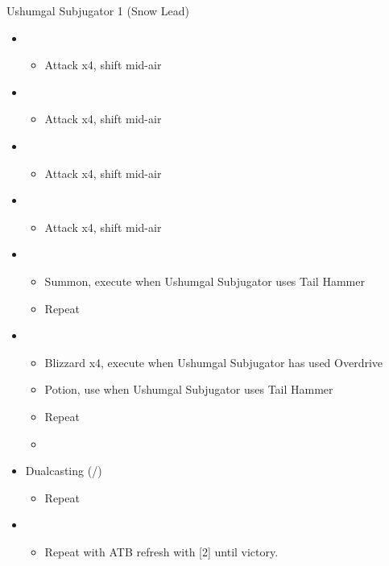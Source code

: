 \begin{paracol}{2}
	\renewcommand{\sixth}{[6] Dualcasting (\rav/\rav)}
	\switchcolumn*
	\begin{battle}{Ushumgal Subjugator 1 (Snow Lead)}
		\begin{itemize}
			\item \first
			      \begin{itemize}
				      \item Attack x4, shift mid-air
			      \end{itemize}
			\item \second
			      \begin{itemize}
				      \item Attack x4, shift mid-air
			      \end{itemize}
			\item \first
			      \begin{itemize}
				      \item Attack x4, shift mid-air
			      \end{itemize}
			\item \second
			      \begin{itemize}
				      \item Attack x4, shift mid-air
			      \end{itemize}
			\item \first
			      \begin{itemize}
				      \item Summon, execute when Ushumgal Subjugator uses Tail Hammer
				      \item Repeat
			      \end{itemize}
			\item \fifth
			      \begin{itemize}
				      \item Blizzard x4, execute when Ushumgal Subjugator has used Overdrive
				      \item Potion, use when Ushumgal Subjugator uses Tail Hammer
				      \item Repeat
				      \item \stagger
			      \end{itemize}
			\item \sixth
			      \begin{itemize}
				      \item Repeat
			      \end{itemize}
			\item \first
			      \begin{itemize}
				      \item Repeat with ATB refresh with [2] until victory.

\end{itemize}
\end{itemize}
\end{battle}
\end{paracol}

